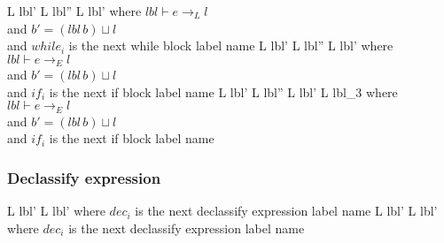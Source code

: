       { {L} {lbl'} }
      { {L} {lbl''} \;  {L} {lbl'} }
      {where $lbl \vdash e \rightarrow_L l$\\
        and $b' = (lbl \, b) \sqcup l$\\
        and $while_i$ is the next while block label name}
      { {L} {lbl'} }
      { {L} {lbl''} \;  {L} {lbl'} }
      {where $lbl \vdash e \rightarrow_E l$\\
        and $b' = (lbl \, b) \sqcup l$\\
        and $if_i$ is the next if block label name}
      { {L} {lbl'} }
      { {L} {lbl''} \;
         {L} {lbl'} \;
         {L} {lbl_3} }
      {where $lbl \vdash e \rightarrow_E l$\\
        and $b' = (lbl \, b) \sqcup l$\\
        and $if_i$ is the next if block label name}

\subsubsection{Declassify expression}

      { {L} {lbl'} }
      { {L} {lbl'} }
      {where $dec_i$ is the next declassify expression label name}
      { {L} {lbl'} }
      { {L} {lbl'} }
      {where $dec_i$ is the next declassify expression label name}


